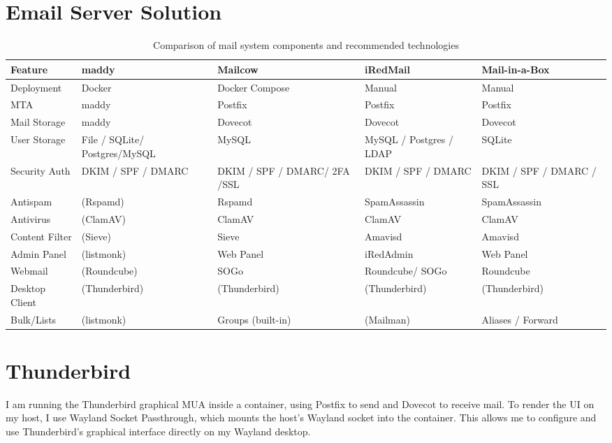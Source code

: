 \section{Email Server Solution}

\begin{table}[h!]
\centering
\renewcommand{\arraystretch}{1.2}
\begin{tabular}{|p{2.6cm}|p{3.2cm}|p{3.2cm}|p{3.2cm}|p{3.2cm}|}
\hline
\textbf{Feature} & \textbf{maddy} & \textbf{Mailcow} & \textbf{iRedMail} & \textbf{Mail-in-a-Box} \\
\hline
Deployment & Docker & Docker Compose & Manual & Manual \\
\hline
MTA & maddy & Postfix & Postfix & Postfix \\
\hline
Mail Storage & maddy & Dovecot & Dovecot & Dovecot \\
\hline
User Storage & File / SQLite/ Postgres/MySQL & MySQL & MySQL / Postgres / LDAP & SQLite \\
\hline
Security Auth & DKIM / SPF / DMARC & DKIM / SPF / DMARC/ 2FA /SSL & DKIM / SPF / DMARC & DKIM / SPF / DMARC / SSL \\
\hline
Antispam & (Rspamd) & Rspamd & SpamAssassin & SpamAssassin \\
\hline
Antivirus & (ClamAV) & ClamAV & ClamAV & ClamAV \\
\hline
Content Filter & (Sieve) & Sieve & Amavisd & Amavisd \\
\hline
Admin Panel & (listmonk) & Web Panel & iRedAdmin & Web Panel \\
\hline
Webmail & (Roundcube) & SOGo & Roundcube/ SOGo & Roundcube \\
\hline
Desktop Client & (Thunderbird) & (Thunderbird) & (Thunderbird) & (Thunderbird) \\
\hline
Bulk/Lists & (listmonk) & Groups (built-in) & (Mailman) & Aliases / Forward \\
\hline
\end{tabular}
\caption{Comparison of mail system components and recommended technologies}
\end{table}

\section{Thunderbird}

I am running the Thunderbird graphical MUA inside a container, using Postfix to send and Dovecot to receive mail. To render the UI on my host, I use Wayland Socket Passthrough, which mounts the host's Wayland socket into the container. This allows me to configure and use Thunderbird's graphical interface directly on my Wayland desktop.